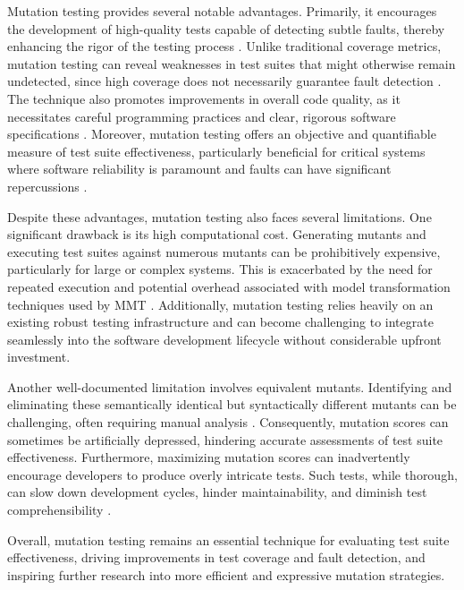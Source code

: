 \documentclass[sigplan, nonacm]{acmart}
\begin{document}
Mutation testing provides several notable advantages. Primarily, it encourages the development of high-quality tests capable of detecting subtle faults, thereby enhancing the rigor of the testing process \cite{jia_analysis_2011}. Unlike traditional coverage metrics, mutation testing can reveal weaknesses in test suites that might otherwise remain undetected, since high coverage does not necessarily guarantee fault detection \cite{jia_analysis_2011,bockisch_mmt_2024}. The technique also promotes improvements in overall code quality, as it necessitates careful programming practices and clear, rigorous software specifications \cite{offutt_mutation_2001}. Moreover, mutation testing offers an objective and quantifiable measure of test suite effectiveness, particularly beneficial for critical systems where software reliability is paramount and faults can have significant repercussions \cite{offutt_mutation_2001,jia_analysis_2011}.

Despite these advantages, mutation testing also faces several limitations. One significant drawback is its high computational cost. Generating mutants and executing test suites against numerous mutants can be prohibitively expensive, particularly for large or complex systems. This is exacerbated by the need for repeated execution and potential overhead associated with model transformation techniques used by MMT \cite{bockisch_mutation_2024}. Additionally, mutation testing relies heavily on an existing robust testing infrastructure and can become challenging to integrate seamlessly into the software development lifecycle without considerable upfront investment.

Another well-documented limitation involves equivalent mutants. Identifying and eliminating these semantically identical but syntactically different mutants can be challenging, often requiring manual analysis \cite{jia_analysis_2011}. Consequently, mutation scores can sometimes be artificially depressed, hindering accurate assessments of test suite effectiveness. Furthermore, maximizing mutation scores can inadvertently encourage developers to produce overly intricate tests. Such tests, while thorough, can slow down development cycles, hinder maintainability, and diminish test comprehensibility \cite{offutt_mutation_2001,jia_analysis_2011}.

Overall, mutation testing remains an essential technique for evaluating test suite effectiveness, driving improvements in test coverage and fault detection, and inspiring further research into more efficient and expressive mutation strategies.
\end{document}
